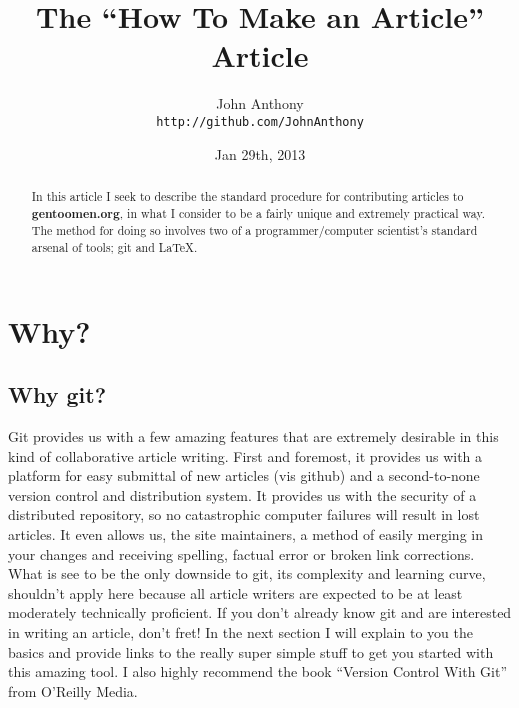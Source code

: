 \documentclass{article}
\begin{document}
\title{The ``How To Make an Article'' Article}
\author{John Anthony\\
  \texttt{http://github.com/JohnAnthony}}
  \date{Jan 29th, 2013}
\maketitle

\begin{abstract}
  In this article I seek to describe the standard procedure for contributing articles to \textbf{gentoomen.org}, in what I consider to be a fairly unique and extremely practical way. The method for doing so involves two of a programmer/computer scientist's standard arsenal of tools; git and \LaTeX{}.
\end{abstract}
        
\section{Why?}
\subsection{Why git?}
  Git provides us with a few amazing features that are extremely desirable in this kind of collaborative article writing. First and foremost, it provides us with a platform for easy submittal of new articles (vis github) and a second-to-none version control and distribution system. It provides us with the security of a distributed repository, so no catastrophic computer failures will result in lost articles. It even allows us, the site maintainers, a method of easily merging in your changes and receiving spelling, factual error or broken link corrections. \\
  What is see to be the only downside to git, its complexity and learning curve, shouldn't apply here because all article writers are expected to be at least moderately technically proficient. If you don't already know git and are interested in writing an article, don't fret! In the next section I will explain to you the basics and provide links to the really super simple stuff to get you started with this amazing tool. I also highly recommend the book ``Version Control With Git'' from O'Reilly Media.
\end{document}
